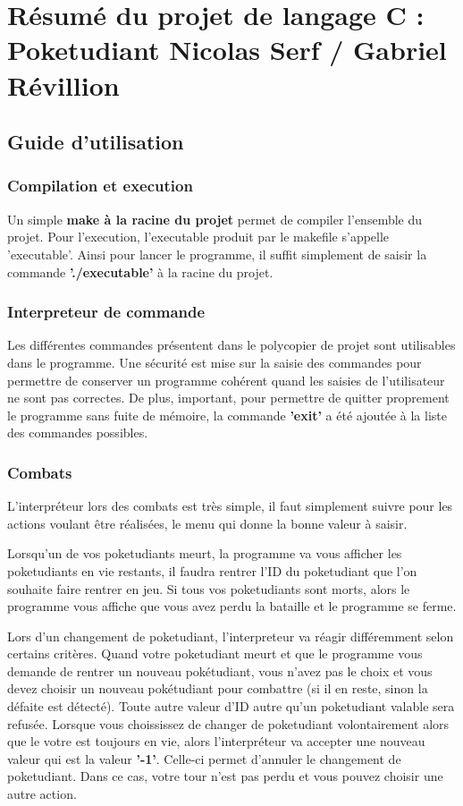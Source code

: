 \documentclass[10pt,a4paper,twocolumn]{report}
\begin{document}
\part{Résumé du projet de langage C : Poketudiant\newline
Nicolas Serf / Gabriel Révillion}

\chapter{Guide d'utilisation}
\section{Compilation et execution}
Un simple \textbf{make à la racine du projet} permet de compiler l'ensemble du projet.
Pour l'execution, l'executable produit par le makefile s'appelle 'executable'.
Ainsi pour lancer le programme, il suffit simplement de saisir la commande \textbf{'./executable'} à la racine du projet.
\section{Interpreteur de commande}
Les différentes commandes présentent dans le polycopier de projet sont utilisables dans le programme.
Une sécurité est mise sur la saisie des commandes pour permettre de conserver un programme cohérent quand les saisies de l'utilisateur ne sont pas correctes.
De plus, important, pour permettre de quitter proprement le programme sans fuite de mémoire, la commande \textbf{'exit'} a été ajoutée à la liste des commandes possibles.
\section{Combats}
L'interpréteur lors des combats est très simple, il faut simplement suivre pour les actions voulant être réalisées, le menu qui donne la bonne valeur à saisir.

Lorsqu'un de vos poketudiants meurt, la programme va vous afficher les poketudiants en vie restants, il faudra rentrer l'ID du poketudiant que l'on souhaite faire rentrer en jeu.
Si tous vos poketudiants sont morts, alors le programme vous affiche que vous avez perdu la bataille et le programme se ferme.

Lors d'un changement de poketudiant, l'interpreteur va réagir différemment selon certains critères.
Quand votre poketudiant meurt et que le programme vous demande de rentrer un nouveau pokétudiant, vous n'avez pas le choix et vous devez choisir un nouveau pokétudiant pour combattre (si il en reste, sinon la défaite est détecté). Toute autre valeur d'ID autre qu'un poketudiant valable sera refusée.
Lorsque vous choississez de changer de poketudiant volontairement alors que le votre est toujours en vie, alors l'interpréteur va accepter une nouveau valeur qui est la valeur \textbf{'-1'}. Celle-ci permet d'annuler le changement de poketudiant. Dans ce cas, votre tour n'est pas perdu et vous pouvez choisir une autre action.
\end{document}
